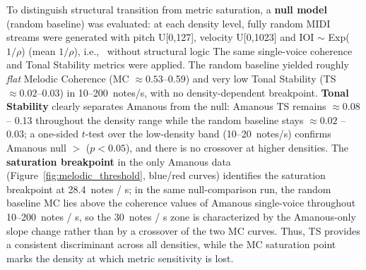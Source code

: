 \documentclass[a4paper]{article}
\theoremstyle{definition}
\theoremstyle{remark}
\begin{document}
To distinguish structural transition from metric saturation, a \textbf{null model} (random baseline) was evaluated: at each density level, fully random MIDI streams were generated with pitch U[0,127], velocity U[0,1023] and IOI $\sim$ Exp($1/\rho$) (mean $1/\rho$), i.e., \ without structural logic  The same single-voice coherence and Tonal Stability metrics were applied. The random baseline yielded roughly \emph{flat} Melodic Coherence (MC $\approx 0.53$--0.59) and very low Tonal Stability (TS $\approx 0.02$--0.03) in 10--200~notes/s, with no density-dependent breakpoint. \textbf{Tonal Stability} clearly separates Amanous from the null: Amanous TS remains $\approx 0.08$ -- 0.13 throughout the density range while the random baseline stays $\approx 0.02$ -- 0.03; a one-sided $t$-test over the low-density band (10--20~notes/s) confirms Amanous null $>$ ($p < 0.05$), and there is no crossover at higher densities. The \textbf{saturation breakpoint} in the only Amanous data (Figure~\ref{fig:melodic_threshold}, blue/red curves) identifies the saturation breakpoint at 28.4~notes / s; in the same null-comparison run, the random baseline MC lies above the coherence values of Amanous single-voice throughout 10--200~notes / s, so the 30~notes / s zone is characterized by the Amanous-only slope change rather than by a crossover of the two MC curves. Thus, TS provides a consistent discriminant across all densities, while the MC saturation point marks the density at which metric sensitivity is lost.
\end{document}
